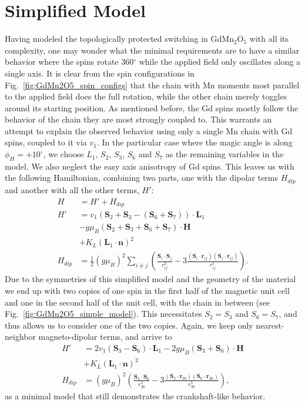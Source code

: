 \section{Simplified Model}
Having modeled the topologically protected switching in  GdMn$_2$O$_5$ with all its complexity, one may wonder what the minimal requirements are to have a similar behavior where the spins rotate 360$^\circ$ while the applied field only oscillates along a single axis.
It is clear from the spin configurations in Fig.~\ref{fig:GdMn2O5_spin_configs} that the chain with Mn moments most parallel to the applied field does the full rotation, while the other chain merely toggles around its starting position. As mentioned before, the Gd spins mostly follow the behavior of the chain they are most strongly coupled to. This warrants an attempt to explain the observed behavior using only a single Mn chain with Gd spins, coupled to it via $v_1$. 
In the particular case where the magic angle is along $\phi_H = +10^\circ$, we choose $L_1$, $S_2$, $S_3$, $
S_6$ and $S_7$ as the remaining variables in the model. We also neglect the easy axis anisotropy of Gd spins.
This leaves us with the following Hamiltonian, combining two parts, one with the dipolar terms $H_{dip}$ and another with all the other terms, $H'$:
\begin{align}
	H &= H' + H_{dip} \\
	H' &= v_1(\bm{S}_2 + \bm{S}_3 - (\bm{S}_6 + \bm{S}_7))\cdot\bm{L}_1 \nonumber\\
	&- g \mu_B (\bm{S}_2 + \bm{S}_3 + \bm{S}_6 + \bm{S}_7) \cdot \bm{H} \nonumber\\
	&+ K_L (\bm{L}_1 \cdot \bm{n})^2 \nonumber\\
	H_{dip} &= \frac{1}{2}(g \mu_B)^2\sum_{i\neq j}\left(\frac{\bm{S}_i\cdot \bm{S}_j}{r_{ij}^
3}-3\frac{(\bm{S}_i\cdot \bm{r}_{ij})(\bm{S}_j\cdot \bm{r}_{ij})}{r_{ij}^5}\right)\nonumber.
\end{align}
Due to the symmetries of this simplified model and the geometry of the material we end up with two copies of one spin in the first half of the magnetic unit cell and one in the second half of the unit cell, with the chain in between (see Fig.~\ref{fig:GdMn2O5_simple_model}).
This necessitates $S_2 = S_3$ and $S_6 = S_7$, and thus allows us to consider one of the two copies. Again, we keep only nearest-neighbor magneto-dipolar terms, and arrive to
\begin{align}
	H' &= 2v_1(\bm{S}_3 - \bm{S}_6)\cdot\bm{L}_1 - 2g \mu_B (\bm{S}_3 + \bm{S}_6) 
\cdot \bm{H} \\
	&+ K_L (\bm{L}_1 \cdot \bm{n})^2 \nonumber\\
	H_{dip} &= (g \mu_B)^2\left(\frac{\bm{S}_3\cdot \bm{S}_6}{r_{36}^3}-3\frac{(\bm{S}_3\cdot \bm{r}_{36})(\bm{S}_6\cdot \bm{r}_{36})}{r_{36}^5}\right)\nonumber,
\end{align}
as a minimal model that still demonstrates the crankshaft-like behavior.

